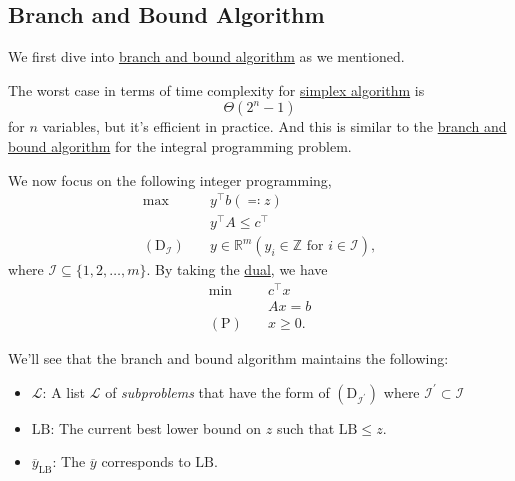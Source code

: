 \subsection{Branch and Bound Algorithm}\label{subsec:branch-and-bound}
We first dive into \hyperref[eg:branch-and-bound]{branch and bound algorithm} as we mentioned.
\begin{prev}
	The worst case in terms of time complexity for \hyperref[algo:simplex-algorithm]{simplex algorithm} is
	\[
		\Theta(2^n - 1)
	\]
	for \(n\) variables, but it's efficient in practice. And this is similar to the \hyperref[eg:branch-and-bound]{branch and bound algorithm} for the integral programming problem.
\end{prev}

We now focus on the following integer programming,
\[
	\begin{aligned}
		\max~                            & y^{\top}b(\eqqcolon z)                                              \\
		                                 & y^{\top}A\leq c^{\top}                                              \\
		(\mathrm{D}_{\mathcal{I} })\quad & y\in\mathbb{R}^m(y_{i}\in\mathbb{Z} \text{ for } i\in \mathcal{I}),
	\end{aligned}
\]
where \(\mathcal{I} \subseteq \{1, 2, \dots , m\}\). By taking the \hyperref[def:dual]{dual}, we have
\[
	\begin{aligned}
		\min~             & c^{\top}x \\
		                  & Ax = b    \\
		(\mathrm{P})\quad & x\geq 0.
	\end{aligned}
\]

We'll see that the branch and bound algorithm maintains the following:
\begin{itemize}
	\item \(\mathcal{L} \): A list \(\mathcal{L} \) of \emph{subproblems} that have the form of \((\mathrm{D}_{\mathcal{I}^\prime})\) where \(\mathcal{I} ^\prime \subset \mathcal{I}\)
	\item \(\mathrm{LB} \): The current best lower bound on \(z\) such that \(\mathrm{LB}\leq z \).
	\item \(\overline{y}_{\mathrm{LB}}\): The \(\overline{y}\) corresponds to \(\mathrm{LB}\).
\end{itemize}

